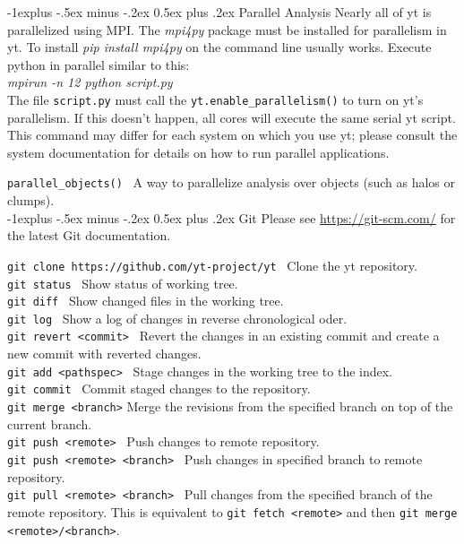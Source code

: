 \documentclass[10pt,landscape]{article}
\makeatletter
\renewcommand{\subsection}{\@startsection{subsection}{2}{0mm}%
                                {-1explus -.5ex minus -.2ex}%
                                {0.5ex plus .2ex}%
                                {\normalfont\normalsize\bfseries}}
\makeatother
\begin{document}
\begin{multicols}{3}
\subsection{Parallel Analysis}
Nearly all of yt is parallelized using
MPI\@.  The \textit{mpi4py} package must be installed for parallelism in yt.  To
install \textit{pip install mpi4py} on the command line usually works.
Execute python in parallel similar to this:\\
\textit{mpirun -n 12 python script.py}\\
The file \texttt{script.py} must call the \texttt{yt.enable\_parallelism()} to
turn on yt's parallelism.  If this doesn't happen, all cores will execute the
same serial yt script.  This command may differ for each system on which you use
yt; please consult the system documentation for details on how to run parallel
applications.

\texttt{parallel\_objects()} \textemdash\ A way to parallelize analysis over objects
(such as halos or clumps).\\


\subsection{Git}
Please see \url{https://git-scm.com/} for the latest Git documentation.

\texttt{git clone https://github.com/yt-project/yt} \textemdash\ Clone the yt
repository. \\
\texttt{git status} \textemdash\ Show status of working tree.\\
\texttt{git diff} \textemdash\ Show changed files in the working tree. \\
\texttt{git log} \textemdash\ Show a log of changes in reverse chronological
oder.\\
\texttt{git revert <commit>} \textemdash\ Revert the changes in an existing
commit and create a new commit with reverted changes. \\
\texttt{git add <pathspec>} \textemdash\ Stage changes in the working tree to
the index. \\
\texttt{git commit} \textemdash\ Commit staged changes to the repository. \\
\texttt{git merge <branch>} Merge the revisions from the specified branch on
top of the current branch.\\
\texttt{git push <remote>} \textemdash\ Push changes to remote repository. \\
\texttt{git push <remote> <branch>} \textemdash\ Push changes in specified
branch to remote repository. \\
\texttt{git pull <remote> <branch>} \textemdash\ Pull changes from the
specified branch of the remote repository. This is equivalent to \texttt{git
fetch <remote>} and then \texttt{git merge <remote>/<branch>}.\\


\end{multicols}
\end{document}
